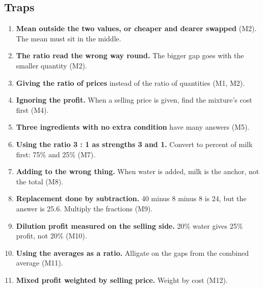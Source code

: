 \documentclass[11pt,a4paper]{article}
\let\oldsubsection\subsection
\renewcommand{\subsection}{\needspace{9\baselineskip}\oldsubsection}
\begin{document}
\subsection*{Traps}
\begin{enumerate}
\item \textbf{Mean outside the two values, or cheaper and dearer swapped} (M2). The mean must sit in the middle.
\item \textbf{The ratio read the wrong way round.} The bigger gap goes with the smaller quantity (M2).
\item \textbf{Giving the ratio of prices} instead of the ratio of quantities (M1, M2).
\item \textbf{Ignoring the profit.} When a selling price is given, find the mixture's cost first (M4).
\item \textbf{Three ingredients with no extra condition} have many answers (M5).
\item \textbf{Using the ratio 3 : 1 as strengths 3 and 1.} Convert to percent of milk first: 75\% and 25\% (M7).
\item \textbf{Adding to the wrong thing.} When water is added, milk is the anchor, not the total (M8).
\item \textbf{Replacement done by subtraction.} 40 minus 8 minus 8 is 24, but the answer is 25.6. Multiply the fractions (M9).
\item \textbf{Dilution profit measured on the selling side.} 20\% water gives 25\% profit, not 20\% (M10).
\item \textbf{Using the averages as a ratio.} Alligate on the gaps from the combined average (M11).
\item \textbf{Mixed profit weighted by selling price.} Weight by cost (M12).
\end{enumerate}
\end{document}
